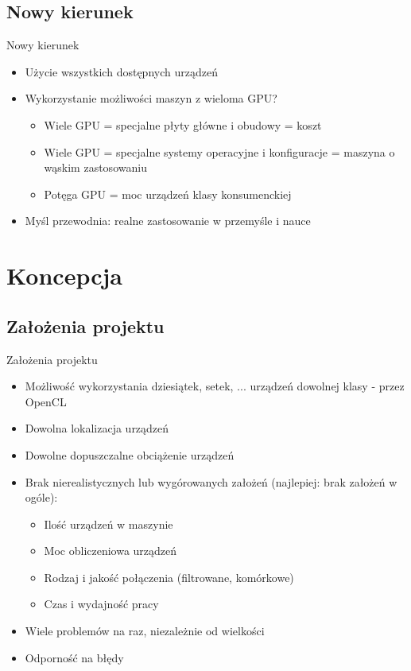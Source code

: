 \documentclass[12pt]{beamer}
\begin{document}
\subsection{Nowy kierunek}
\begin{frame}{Nowy kierunek}
\begin{itemize}
	\item Użycie wszystkich dostępnych urządzeń
	\item Wykorzystanie możliwości maszyn z wieloma GPU?
	\begin{itemize}
	    \item Wiele GPU = specjalne płyty główne i obudowy = koszt
	    \item Wiele GPU = specjalne systemy operacyjne i konfiguracje = maszyna o wąskim zastosowaniu
	    \item Potęga GPU = moc urządzeń klasy konsumenckiej
	\end{itemize}
	\item Myśl przewodnia: realne zastosowanie w przemyśle i nauce	
\end{itemize}
\end{frame}

\section{Koncepcja}
\subsection{Założenia projektu}
\begin{frame}{Założenia projektu}
\begin{itemize}
	\item Możliwość wykorzystania dziesiątek, setek, ... urządzeń dowolnej klasy - przez OpenCL
	\item Dowolna lokalizacja urządzeń
	\item Dowolne dopuszczalne obciążenie urządzeń
	\item Brak nierealistycznych lub wygórowanych założeń (najlepiej: brak założeń w ogóle):
	\begin{itemize}
		\item Ilość urządzeń w maszynie
		\item Moc obliczeniowa urządzeń
		\item Rodzaj i jakość połączenia (filtrowane, komórkowe)
		\item Czas i wydajność pracy	
	\end{itemize}
	\item Wiele problemów na raz, niezależnie od wielkości
	\item Odporność na błędy
\end{itemize}
\end{frame}
\end{document}
